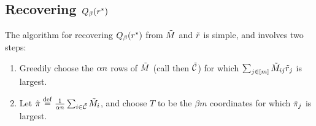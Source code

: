 \subsection{Recovering $Q_{\beta}(r^*)$}
\label{sec:approach-r}

The algorithm for recovering $Q_{\beta}(r^*)$ from $\tilde{M}$ and $\tilde{r}$ 
is simple, and involves two steps:
\begin{enumerate}
\item Greedily choose the $\alpha n$ rows of $\tilde{M}$ (call then $\tilde{\mathcal{C}}$) 
      for which $\sum_{j \in [m]} \tilde{M}_{ij}\tilde{r}_j$ is largest.
\item Let $\tilde{\pi} \stackrel{\rm def}{=} \frac{1}{\alpha n} \sum_{i \in \tilde{\mathcal{C}}} \tilde{M}_i$, 
      and choose $T$ to be the $\beta m$ coordinates for which $\tilde{\pi}_j$ is 
      largest.
\end{enumerate}


